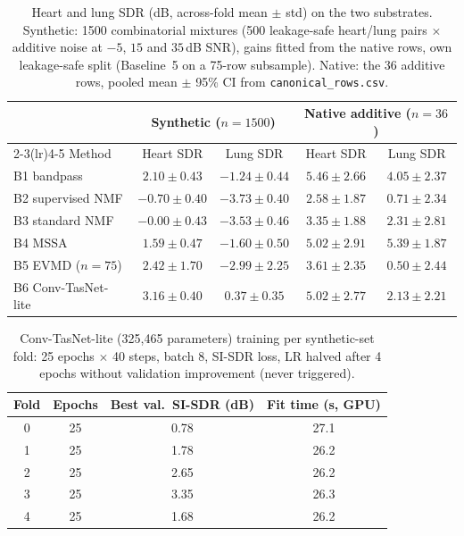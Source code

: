 \documentclass[conference]{IEEEtran}
\begin{document}
\begin{table}[htbp]
\centering
\caption{Heart and lung SDR (dB, across-fold mean $\pm$ std) on the two substrates. Synthetic: 1500 combinatorial mixtures (500 leakage-safe heart/lung pairs $\times$ additive noise at $-5$, $15$ and $35$\,dB SNR), gains fitted from the native rows, own leakage-safe split (Baseline~5 on a 75-row subsample). Native: the 36 additive rows, pooled mean $\pm$ 95\% CI from \texttt{canonical\_rows.csv}.}
\label{pi:substrates}
\begin{tabular}{@{}lcc@{\hspace{2em}}cc@{}}
\toprule
 & \multicolumn{2}{c}{Synthetic ($n{=}1500$)} & \multicolumn{2}{c}{Native additive ($n{=}36$)} \\
\cmidrule(lr){2-3}\cmidrule(lr){4-5}
Method & Heart SDR & Lung SDR & Heart SDR & Lung SDR \\
\midrule
B1 bandpass        & $2.10 \pm 0.43$  & $-1.24 \pm 0.44$ & $5.46 \pm 2.66$ & $4.05 \pm 2.37$ \\
B2 supervised NMF  & $-0.70 \pm 0.40$ & $-3.73 \pm 0.40$ & $2.58 \pm 1.87$ & $0.71 \pm 2.34$ \\
B3 standard NMF    & $-0.00 \pm 0.43$ & $-3.53 \pm 0.46$ & $3.35 \pm 1.88$ & $2.31 \pm 2.81$ \\
B4 MSSA            & $1.59 \pm 0.47$  & $-1.60 \pm 0.50$ & $5.02 \pm 2.91$ & $5.39 \pm 1.87$ \\
B5 EVMD ($n{=}75$)  & $2.42 \pm 1.70$  & $-2.99 \pm 2.25$ & $3.61 \pm 2.35$ & $0.50 \pm 2.44$ \\
B6 Conv-TasNet-lite & $3.16 \pm 0.40$ & $0.37 \pm 0.35$  & $5.02 \pm 2.77$ & $2.13 \pm 2.21$ \\
\bottomrule
\end{tabular}
\end{table}

\begin{table}[htbp]
\centering
\caption{Conv-TasNet-lite (325{,}465 parameters) training per synthetic-set fold: 25 epochs $\times$ 40 steps, batch 8, SI-SDR loss, LR halved after 4 epochs without validation improvement (never triggered).}
\label{pi:b6diag}
\begin{tabular}{@{}cccc@{}}
\toprule
Fold & Epochs & Best val.\ SI-SDR (dB) & Fit time (s, GPU) \\
\midrule
0 & 25 & 0.78 & 27.1 \\
1 & 25 & 1.78 & 26.2 \\
2 & 25 & 2.65 & 26.2 \\
3 & 25 & 3.35 & 26.3 \\
4 & 25 & 1.68 & 26.2 \\
\bottomrule
\end{tabular}
\end{table}
\end{document}
